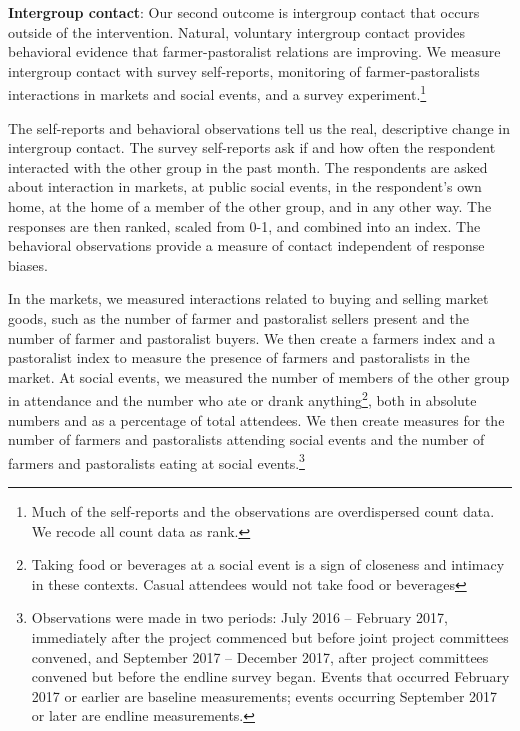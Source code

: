 \documentclass[11pt]{article}
\begin{document}
\textbf{Intergroup contact}: Our second outcome is intergroup contact
that occurs outside of the intervention. Natural, voluntary intergroup
contact provides behavioral evidence that farmer-pastoralist relations
are improving. We measure intergroup contact with survey self-reports,
monitoring of farmer-pastoralists interactions in markets and social
events, and a survey experiment.\footnote{Much of the self-reports and
  the observations are overdispersed count data. We recode all count
  data as rank.}

The self-reports and behavioral observations tell us the real,
descriptive change in intergroup contact. The survey self-reports ask if
and how often the respondent interacted with the other group in the past
month. The respondents are asked about interaction in markets, at public
social events, in the respondent's own home, at the home of a member of
the other group, and in any other way. The responses are then ranked,
scaled from 0-1, and combined into an index. The behavioral observations
provide a measure of contact independent of response biases.

In the markets, we measured interactions related to buying and selling
market goods, such as the number of farmer and pastoralist sellers
present and the number of farmer and pastoralist buyers. We then create
a farmers index and a pastoralist index to measure the presence of
farmers and pastoralists in the market. At social events, we measured
the number of members of the other group in attendance and the number
who ate or drank anything\footnote{Taking food or beverages at a social
  event is a sign of closeness and intimacy in these contexts. Casual
  attendees would not take food or beverages}, both in absolute numbers
and as a percentage of total attendees. We then create measures for the
number of farmers and pastoralists attending social events and the
number of farmers and pastoralists eating at social events.\footnote{Observations
  were made in two periods: July 2016 -- February 2017, immediately
  after the project commenced but before joint project committees
  convened, and September 2017 -- December 2017, after project
  committees convened but before the endline survey began. Events that
  occurred February 2017 or earlier are baseline measurements; events
  occurring September 2017 or later are endline measurements.}
\end{document}
